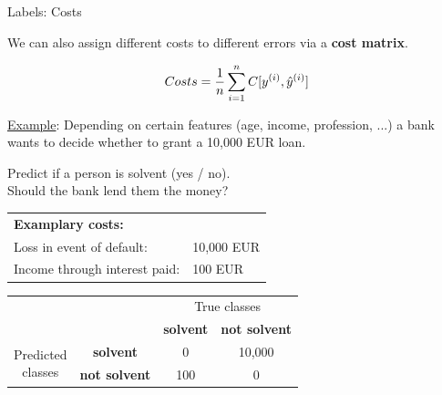 \documentclass[11pt,compress,t,notes=noshow, xcolor=table]{beamer}
\begin{document}
\begin{vbframe}{Labels: Costs}

\small

We can also assign different costs to different errors via a 
\textbf{cost matrix}.

$$
  Costs = \frac{1}{n} \sum\limits_{i=1}^n C[y^{(i)}, \hat{y}^{(i)}]
$$

\underline{Example}: %
Depending on certain features (age, income, profession, ...) a bank wants to 
decide whether to grant a 10,000 EUR loan.\\ 

\medskip

Predict if a person is solvent (yes / no).\\ 
Should the bank lend them the money?\\

\medskip
  \begin{tabular}{ll}
    \textbf{Examplary costs:} & \\
    Loss in event of default: & 10,000 EUR\\
    Income through interest paid: & 100 EUR\\
  \end{tabular}
 
\begin{table}[ht]
  \small
  \begin{tabular}{cccc}
    \hline
    & &\multicolumn{2}{c}{True classes} \\ 
    & &\textbf{solvent} & \textbf{not solvent}  \\ 
    \hline
    \multirow{2}{*}{\parbox{1cm}{Predicted \\ classes}}& \textbf{solvent}     & 0                 & 10,000\\
    & \textbf{not solvent} & 100               & 0\\
    \hline
\end{tabular}
\end{table}
 
\end{vbframe}

\end{document}
